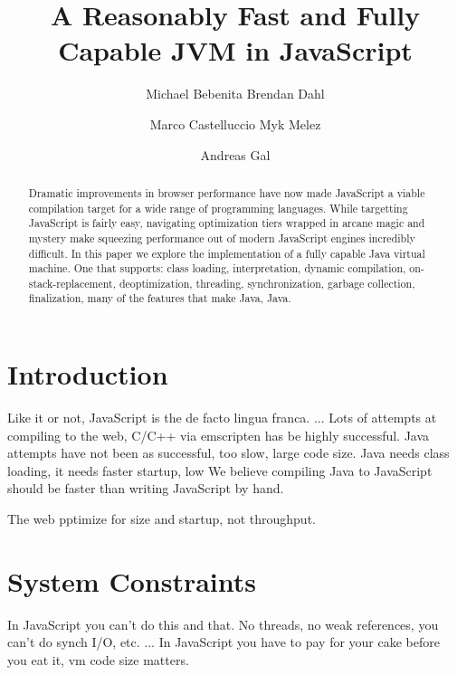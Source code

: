 \documentclass{acm_proc_article-sp}
\begin{document}
\title{A Reasonably Fast and Fully Capable JVM in JavaScript}

\author{
\alignauthor Michael Bebenita
\alignauthor Brendan Dahl
\and
\alignauthor Marco Castelluccio
\alignauthor Myk Melez
\and
\alignauthor Andreas Gal
}

\maketitle
\begin{abstract}
Dramatic improvements in browser performance have now made JavaScript a viable compilation target for a wide range of programming languages.
While targetting JavaScript is fairly easy, navigating optimization tiers wrapped in arcane magic and mystery make squeezing performance out of modern JavaScript engines incredibly difficult.
In this paper we explore the implementation of a fully capable Java virtual machine. One that supports: class loading, interpretation, dynamic compilation, on-stack-replacement, deoptimization, threading, synchronization, garbage collection, finalization, many of the features that make Java, Java.
\end{abstract}




\section{Introduction}

Like it or not, JavaScript is the de facto lingua franca. ...
Lots of attempts at compiling to the web, C/C++ via emscripten has be highly successful.
Java attempts have not been as successful, too slow, large code size.
Java needs class loading, it needs faster startup, low 
We believe compiling Java to JavaScript should be faster than writing JavaScript by hand.

The web pptimize for size and startup, not throughput.

\section{System Constraints}

In JavaScript you can't do this and that. No threads, no weak references, you can't do synch I/O, etc. ...
In JavaScript you have to pay for your cake before you eat it, vm code size matters.
\end{document}

